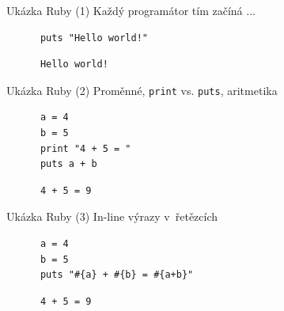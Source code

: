 \documentclass{beamer}
\begin{document}
\begin{frame}[fragile]{Ukázka Ruby (1)}
  Každý programátor tím začíná ...
  \begin{block}{}
    \smallskip \footnotesize
    {\scriptsize \begin{verbatim}
      puts "Hello world!"
    \end{verbatim}}
  \end{block}
  \pause
  \begin{block}{}
    \smallskip \footnotesize
    {\scriptsize \begin{verbatim}
      Hello world!
    \end{verbatim}}
  \end{block}
\end{frame}

\begin{frame}[fragile]{Ukázka Ruby (2)}
  Proměnné, \texttt{print} vs. \texttt{puts}, aritmetika
  \begin{block}{}
    \smallskip \footnotesize
    {\scriptsize \begin{verbatim}
      a = 4
      b = 5
      print "4 + 5 = "
      puts a + b
    \end{verbatim}}
  \end{block}
  \pause
  \begin{block}{}
    \smallskip \footnotesize
    {\scriptsize \begin{verbatim}
      4 + 5 = 9
    \end{verbatim}}
  \end{block}
\end{frame}

\begin{frame}[fragile]{Ukázka Ruby (3)}
  In-line výrazy v~řetězcích
  \begin{block}{}
    \smallskip \footnotesize
    {\scriptsize \begin{verbatim}
      a = 4
      b = 5
      puts "#{a} + #{b} = #{a+b}"
    \end{verbatim}}
  \end{block}
  \pause
  \begin{block}{}
    \smallskip \footnotesize
    {\scriptsize \begin{verbatim}
      4 + 5 = 9
    \end{verbatim}}
  \end{block}
\end{frame}
\end{document}
